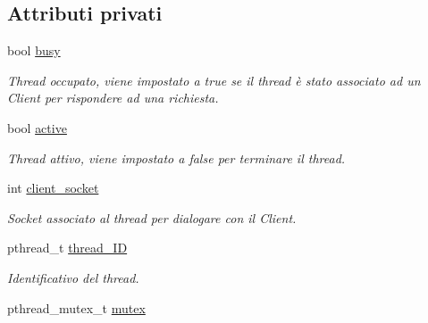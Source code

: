 \subsection*{Attributi privati}
\begin{DoxyCompactItemize}
\item 
\hypertarget{class_threads_abed55b6a7e70edfb736b738bce7964d6}{bool \hyperlink{class_threads_abed55b6a7e70edfb736b738bce7964d6}{busy}}\label{class_threads_abed55b6a7e70edfb736b738bce7964d6}

\begin{DoxyCompactList}\small\item\em {\itshape Thread} occupato, viene impostato a {\ttfamily true} se il {\itshape thread} è stato associato ad un {\itshape Client} per rispondere ad una richiesta. \end{DoxyCompactList}\item 
\hypertarget{class_threads_a13f564c85b6bd2bc3bd39c12c612bb7a}{bool \hyperlink{class_threads_a13f564c85b6bd2bc3bd39c12c612bb7a}{active}}\label{class_threads_a13f564c85b6bd2bc3bd39c12c612bb7a}

\begin{DoxyCompactList}\small\item\em {\itshape Thread} attivo, viene impostato a {\ttfamily false} per terminare il {\itshape thread}. \end{DoxyCompactList}\item 
\hypertarget{class_threads_a5e30e204ecd4404d0f88514227b849a9}{int \hyperlink{class_threads_a5e30e204ecd4404d0f88514227b849a9}{client\-\_\-socket}}\label{class_threads_a5e30e204ecd4404d0f88514227b849a9}

\begin{DoxyCompactList}\small\item\em {\itshape Socket} associato al {\itshape thread} per dialogare con il {\itshape Client}. \end{DoxyCompactList}\item 
\hypertarget{class_threads_ab7e3c990d2c44c2352b4d9d682a5edaf}{pthread\-\_\-t \hyperlink{class_threads_ab7e3c990d2c44c2352b4d9d682a5edaf}{thread\-\_\-\-I\-D}}\label{class_threads_ab7e3c990d2c44c2352b4d9d682a5edaf}

\begin{DoxyCompactList}\small\item\em Identificativo del {\itshape thread}. \end{DoxyCompactList}\item 
\hypertarget{class_threads_afc98741291ee4f116654a90c0d26bc7b}{pthread\-\_\-mutex\-\_\-t \hyperlink{class_threads_afc98741291ee4f116654a90c0d26bc7b}{mutex}}\label{class_threads_afc98741291ee4f116654a90c0d26bc7b}


\end{DoxyCompactItemize}
